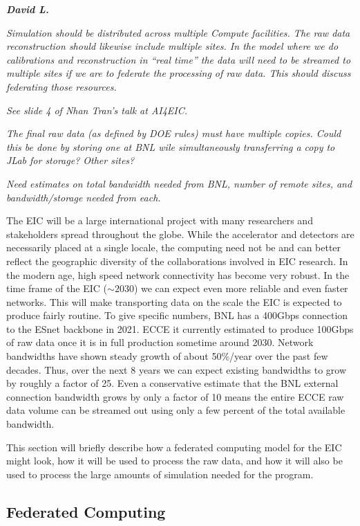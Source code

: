 \textbf{\emph{David L.}}

\emph{Simulation should be distributed across multiple Compute facilities. The raw data reconstruction should likewise include multiple sites. In the model where we do calibrations and reconstruction in ``real time'' the data will need to be streamed to multiple sites if we are to federate the processing of raw data. This should discuss federating those resources.}

\emph{See slide 4 of Nhan Tran's talk at AI4EIC.}

\emph{The final raw data (as defined by DOE rules) must have multiple copies. Could this be done by storing one at BNL wile simultaneously transferring a copy to JLab for storage? Other sites?}

\emph{Need estimates on total bandwidth needed from BNL, number of remote sites, and bandwidth/storage needed from each.}

The EIC will be a large international project with many researchers and stakeholders spread throughout the globe. While the accelerator and detectors are necessarily placed at a single locale, the computing need not be and can better reflect the geographic diversity of the collaborations involved in EIC research. In the modern age, high speed network connectivity has become very robust. In the time frame of the EIC ($\sim 2030$) we can expect even more reliable and even faster networks. This will make transporting data on the scale the EIC is expected to produce fairly routine. To give specific numbers, BNL has a 400Gbps connection to the ESnet backbone in 2021. ECCE it currently estimated to produce 100Gbps of raw data once it is in full production sometime around 2030. Network bandwidths have shown steady growth of about 50\%/year over the past few decades\cite{nielsensLaw2019}. Thus, over the next 8 years we can expect existing bandwidths to grow by roughly a factor of 25. Even a conservative estimate that the BNL external connection bandwidth grows by only a factor of 10 means the entire ECCE raw data volume can be streamed out using only a few percent of the total available bandwidth.

This section will briefly describe how a federated computing model for the EIC might look, how it will be used to process the raw data, and how it will also be used to process the large amounts of simulation needed for the program.

\subsection{Federated Computing}

